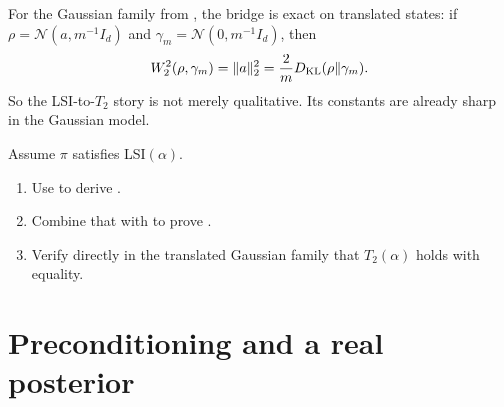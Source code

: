 \documentclass[11pt]{article}
\newif\ifshowsolutions
\newcommand{\SolutionBox}[2][10]{%
  \ifshowsolutions
    \begin{tcolorbox}[stat221panelgray,title={Solution}]
    #2
    \end{tcolorbox}
  \else
    \begin{tcolorbox}[stat221panelgray,unbreakable,title={Workspace}]
    \vspace{#1\baselineskip}
    \end{tcolorbox}
  \fi
}
\begin{document}
For the Gaussian family from , the bridge is exact on translated states:
if $\rho=\mathcal{N}(a,m^{-1}I_d)$ and $\gamma_m=\mathcal{N}(0,m^{-1}I_d)$, then
\[
W_2^2(\rho,\gamma_m)=\lVert a\rVert_2^2=\frac{2}{m}D_{\mathrm{KL}}(\rho\|\gamma_m).
\]
So the LSI-to-$T_2$ story is not merely qualitative.
Its constants are already sharp in the Gaussian model.

\begin{exercise}
\label{ex:lsi-to-w2}
Assume $\pi$ satisfies LSI$(\alpha)$.
\begin{enumerate}[leftmargin=*]
  \item Use  to derive .
  \item Combine that with  to prove .
  \item Verify directly in the translated Gaussian family that $T_2(\alpha)$ holds with equality.
\end{enumerate}
\end{exercise}
\SolutionBox[14]{%
\begin{enumerate}[leftmargin=*]
  \item By entropy dissipation,
  \[
  \frac{d}{dt}D_{\mathrm{KL}}(\rho_t\|\pi)=-I(\rho_t\|\pi).
  \]
  The LSI bound gives
  \[
  I(\rho_t\|\pi)\ge 2\alpha D_{\mathrm{KL}}(\rho_t\|\pi),
  \]
  so
  \[
  \frac{d}{dt}D_{\mathrm{KL}}(\rho_t\|\pi)\le -2\alpha D_{\mathrm{KL}}(\rho_t\|\pi).
  \]
  Gronwall yields
  \[
  D_{\mathrm{KL}}(\rho_t\|\pi)\le e^{-2\alpha t}D_{\mathrm{KL}}(\rho_0\|\pi).
  \]
  \item Talagrand's inequality gives
  \[
  W_2^2(\rho_t,\pi)\le \frac{2}{\alpha}D_{\mathrm{KL}}(\rho_t\|\pi).
  \]
  Substituting the KL decay bound,
  \[
  W_2^2(\rho_t,\pi)\le \frac{2}{\alpha}e^{-2\alpha t}D_{\mathrm{KL}}(\rho_0\|\pi),
  \]
  and taking square roots gives \eqref{eq:w2-decay}.
  \item For $\gamma_\alpha=\mathcal{N}(0,\alpha^{-1}I_d)$ and $\rho=\mathcal{N}(a,\alpha^{-1}I_d)$,
  \[
  W_2^2(\rho,\gamma_\alpha)=\norm{a}_2^2
  \]
  because the optimal transport is translation by $a$, while
  \[
  D_{\mathrm{KL}}(\rho\|\gamma_\alpha)=\frac{\alpha}{2}\norm{a}_2^2.
  \]
  Hence
  \[
  W_2^2(\rho,\gamma_\alpha)=\frac{2}{\alpha}D_{\mathrm{KL}}(\rho\|\gamma_\alpha),
  \]
  so $T_2(\alpha)$ is attained exactly on this translated Gaussian family.%
\end{enumerate}
}

\section{Preconditioning and a real posterior}
\label{sec:preconditioning-real-data}
\end{document}
